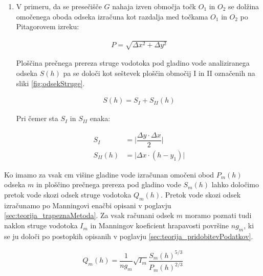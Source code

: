 \begin{enumerate}
\begin{enumerate}
	
	\item V primeru, da se presečišče $G$ nahaja izven območja točk $O_1$ in $O_2$ se dolžina omočenega oboda odseka izračuna kot razdalja med točkama $O_1$ in $O_2$ po Pitagorovem izreku:
	
	\begin{ceqn}
		\begin{align}
		P = \sqrt{ \Delta x^{2} + \Delta y^{2}}
		\end{align}
	\end{ceqn}
	
	Ploščina prečnega prereza struge vodotoka pod gladino vode analiziranega odseka $S(h)$ pa se določi kot seštevek ploščin območij I in II označenih na sliki \ref{fig:odsekStruge}.
	
	\begin{ceqn}
		\begin{align}
		S(h) = S_I + S_{II}(h)
		\end{align}
	\end{ceqn}
	
	Pri čemer sta $S_I$ in $S_{II}$ enaka:
	
		\begin{ceqn}
			\begin{align}
			S_I&= \bigg|\dfrac{ \Delta y \cdot  \Delta x}{2}\bigg|\\
			S_{II}(h)&= \bigg|\Delta x \cdot (h - y_1)\bigg|
			\end{align}
		\end{ceqn}
		
			
		
	\end{enumerate}

\end{enumerate}



Ko imamo za vsak cm višine gladine vode izračunan omočeni obod $P_m(h)$ odseka $m$ in ploščino prečnega prereza pod gladino vode $S_m(h)$ lahko določimo pretok vode skozi odsek struge vodotoka $Q_m(h)$. Pretok vode skozi odsek izračunamo po Manningovi enačbi opisani v poglavju \ref{sec:teorija_trapeznaMetoda}. Za vsak računani odsek $m$ moramo poznati tudi naklon struge vodotoka $I_m$ in  Manningov koeficient hrapavosti površine $ng_m$, ki se ju določi po postopkih opisanih v poglavju \ref{sec:teorija_pridobitevPodatkov}.


\begin{ceqn}
	\begin{align}
	Q_m(h) = \dfrac{1}{ng_m} \sqrt{I_m}\dfrac{S_m(h)^{5/3}}{P_m(h)^{2/3}}
	\end{align}
\end{ceqn}


